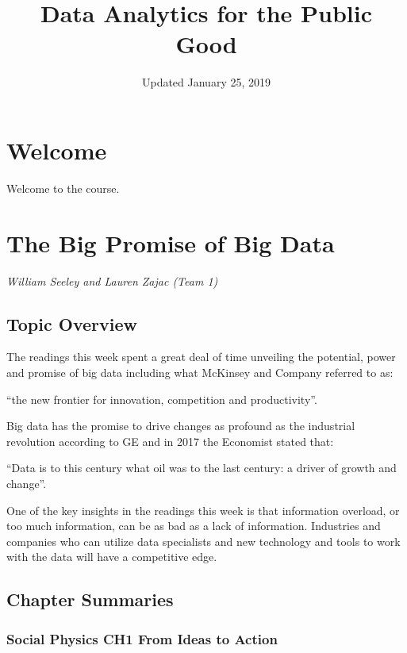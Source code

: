 \documentclass[]{book}
\title{Data Analytics for the Public Good}
\author{}
\date{Updated January 25, 2019}
\theoremstyle{definition}
\theoremstyle{definition}
\theoremstyle{definition}
\theoremstyle{remark}
\begin{document}
\maketitle

{
\setcounter{tocdepth}{1}
\tableofcontents
}
\hypertarget{welcome}{%
\chapter*{Welcome}\label{welcome}}

Welcome to the course.

\hypertarget{the-big-promise-of-big-data}{%
\chapter{The Big Promise of Big
Data}\label{the-big-promise-of-big-data}}

\emph{William Seeley and Lauren Zajac (Team 1)}

\hypertarget{topic-overview}{%
\section{Topic Overview}\label{topic-overview}}

The readings this week spent a great deal of time unveiling the
potential, power and promise of big data including what McKinsey and
Company referred to as:

``the new frontier for innovation, competition and productivity''.

Big data has the promise to drive changes as profound as the industrial
revolution according to GE and in 2017 the Economist stated that:

``Data is to this century what oil was to the last century: a driver of
growth and change''.

One of the key insights in the readings this week is that information
overload, or too much information, can be as bad as a lack of
information. Industries and companies who can utilize data specialists
and new technology and tools to work with the data will have a
competitive edge.

\hypertarget{chapter-summaries}{%
\section{Chapter Summaries}\label{chapter-summaries}}

\hypertarget{social-physics-ch1-from-ideas-to-action}{%
\subsection{\texorpdfstring{Social Physics \textbf{CH1 From Ideas to
Action}}{Social Physics CH1 From Ideas to Action}}\label{social-physics-ch1-from-ideas-to-action}}
\end{document}
